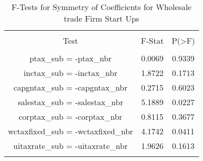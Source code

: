 
\begin{table}[!htbp] \centering 
  \caption{F-Tests for Symmetry of Coefficients for Wholesale trade Firm Start Ups} 
  \label{42Ftests} 
\begin{tabular}{@{\extracolsep{5pt}} ccc} 
\\[-1.8ex]\hline 
\hline \\[-1.8ex] 
Test & F-Stat & P(\textgreater F) \\ 
\hline \\[-1.8ex] 
ptax\_sub = -ptax\_nbr & 0.0069 & 0.9339 \\ 
inctax\_sub = -inctax\_nbr & 1.8722 & 0.1713 \\ 
capgntax\_sub = -capgntax\_nbr & 0.2715 & 0.6023 \\ 
salestax\_sub = -salestax\_nbr & 5.1889 & 0.0227 \\ 
corptax\_sub = -corptax\_nbr & 0.8115 & 0.3677 \\ 
wctaxfixed\_sub = -wctaxfixed\_nbr & 4.1742 & 0.0411 \\ 
uitaxrate\_sub = -uitaxrate\_nbr & 1.9626 & 0.1613 \\ 
\hline \\[-1.8ex] 
\end{tabular} 
\end{table} 
